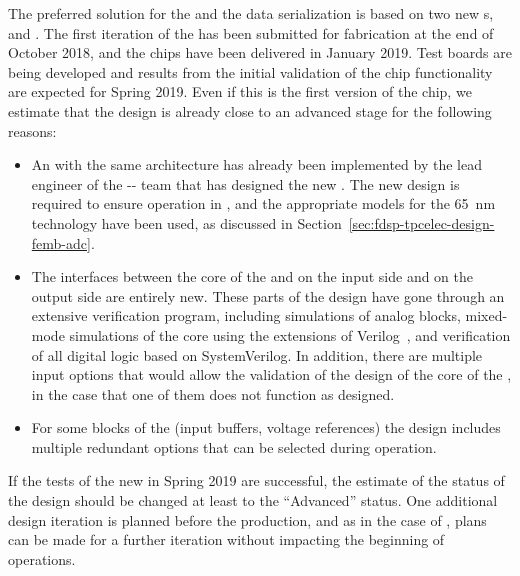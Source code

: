 The preferred solution for the  and the data serialization is based on two new 
s,  and .
The first iteration of the  has been submitted for fabrication
at the end of October 2018, and the chips have been delivered in January 2019.
Test boards are being developed and results from the initial validation of the
chip functionality are expected for Spring 2019. Even if this is the first version
of the chip, we estimate that the design is already close to an advanced stage
for the following reasons:
\begin{itemize}
\item{An  with the same architecture has already been implemented by the
lead engineer of the -- team that has designed the new .
The new design is required to ensure operation in \lar, and the appropriate
models for the \SI{65}{nm} technology have been used, as discussed in
Section~\ref{sec:fdsp-tpcelec-design-femb-adc}.}
\item{The interfaces between the core of the  and  on 
the input side and  on the output side are entirely new.
These parts of the design have gone through an extensive verification
program, including  simulations of analog blocks,
mixed-mode simulations of the core  using the 
extensions of Verilog~\cite{verilog}, and  verification of 
all digital logic based on SystemVerilog. In addition, there are multiple 
input options that would allow the validation of the design of the core 
of the , in the case that one of them does not function as designed.}
\item{For some blocks of the  (input buffers, voltage references) the
design includes multiple redundant options that can be selected during 
operation.}
\end{itemize}
If the tests of the new  in Spring 2019 are successful, the
estimate of the status of the design should be changed at least to the 
``Advanced'' status. One additional design iteration is planned before
the production, and as in the case of , plans can be made for a
further iteration without impacting the beginning of  operations.

